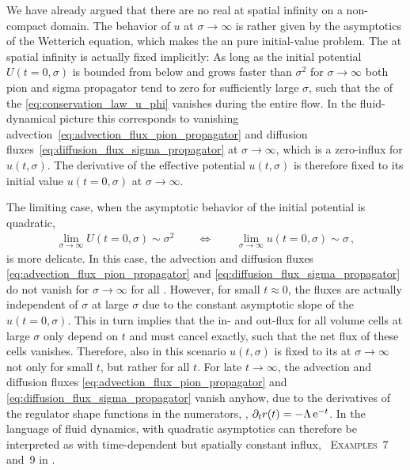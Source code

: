 We have already argued that there are no real \bcs{} at spatial infinity on a non-compact domain.
The behavior of $u$ at $\sigma \rightarrow \infty$ is rather given by the asymptotics of the Wetterich equation, which makes the \pde{} an pure initial-value problem.
The \bc{} at spatial infinity is actually fixed implicitly: As long as the initial potential $U ( t = 0, \sigma )$ is bounded from below and grows faster than $\sigma^2$ for $\sigma \rightarrow \infty$ both pion and sigma propagator tend to zero for sufficiently large $\sigma$, such that the \rhs{} of the \pde{} \eqref{eq:conservation_law_u_phi} vanishes during the entire \frg{} flow.
In the fluid-dynamical picture this corresponds to vanishing advection~\eqref{eq:advection_flux_pion_propagator} and diffusion fluxes~\eqref{eq:diffusion_flux_sigma_propagator} at $\sigma \rightarrow \infty$, which is a zero-influx \bc{} for $u ( t, \sigma )$.
The derivative of the effective potential $u ( t, \sigma )$ is therefore fixed to its initial value $u ( t = 0, \sigma )$ at $\sigma \rightarrow \infty$.

The limiting case, when the asymptotic behavior of the \uv{} initial potential is quadratic,
\begin{align}
	\lim\limits_{\sigma \rightarrow \infty} U ( t = 0, \sigma ) \sim \sigma^2 \qquad\Longleftrightarrow\qquad	\lim\limits_{\sigma \rightarrow \infty} u ( t = 0, \sigma ) \sim \sigma \, ,
\end{align}
is more delicate.
In this case, the advection and diffusion fluxes \eqref{eq:advection_flux_pion_propagator} and \eqref{eq:diffusion_flux_sigma_propagator} do not vanish for $\sigma \rightarrow \infty$ for all \rgtimes{}.
However, for small \rgtimes{} $t \approx 0$, the fluxes are actually independent of $\sigma$ at large $\sigma$ due to the constant asymptotic slope of the \ic{} $u ( t = 0, \sigma )$. 
This in turn implies that the in- and out-flux for all volume cells at large $\sigma$ only depend on $t$ and must cancel exactly, such that the net flux of these cells vanishes.
Therefore, also in this scenario $u ( t, \sigma )$ is fixed to its \ic{} at $\sigma \rightarrow \infty$ not only for small $t$, but rather for all \rgtimes{} $t$.
For late \rgtimes{} $t \rightarrow \infty$, the advection and diffusion fluxes \eqref{eq:advection_flux_pion_propagator} and \eqref{eq:diffusion_flux_sigma_propagator} vanish anyhow, due to the derivatives of the regulator shape functions in the numerators, \ie{}, $\partial_t r ( t ) = - \Lambda \, \mathrm{e}^{-t}$.
In the language of fluid dynamics, \ics{} with quadratic asymptotics can therefore be interpreted as \bcs{} with time-dependent but spatially constant influx, \cf{}\ \textsc{Examples}~7 and~9 in .


